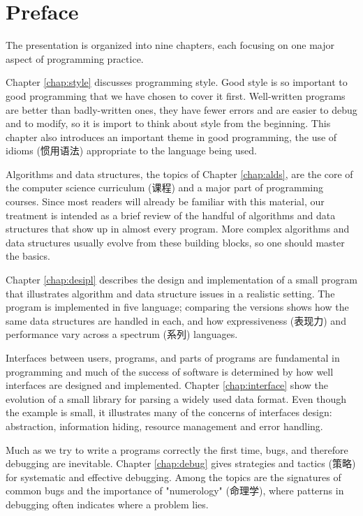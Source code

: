 
\chapter{Preface}
\label{chap:preface}
The presentation is organized into nine chapters, each focusing on one
major aspect of programming practice.

Chapter \ref{chap:style} discusses programming style. Good style is so
important to good programming that we have chosen to cover it first.
Well-written programs are better than badly-written ones, they have fewer
errors and are easier to debug and to modify, so it is import to think
about style from the beginning. This chapter also introduces an important
theme in good programming, the use of idioms (惯用语法) appropriate to the
language being used.

Algorithms and data structures, the topics of Chapter \ref{chap:alds}, are
the core of the computer science curriculum (课程) and a major part of
programming courses. Since most readers will already be familiar with this
material, our treatment is intended as a brief review of the handful of
algorithms and data structures that show up in almost every program. More
complex algorithms and data structures usually evolve from these building
blocks, so one should master the basics.

Chapter \ref{chap:desipl} describes the design and implementation of a
small program that illustrates algorithm and data structure issues in a
realistic setting. The program is implemented in five language; comparing
the versions shows how the same data structures are handled in each, and
how expressiveness (表现力) and performance vary across a spectrum (系列)
languages.

Interfaces between users, programs, and parts of programs are fundamental
in programming and much of the success of software is determined by how
well interfaces are designed and implemented. Chapter \ref{chap:interface}
show the evolution of a small library for parsing a widely used data
format. Even though the example is small, it illustrates many of the
concerns of interfaces design: abstraction, information hiding, resource
management and error handling.

Much as we try to write a programs correctly the first time, bugs, and
therefore debugging are inevitable. Chapter \ref{chap:debug} gives
strategies and tactics (策略) for systematic and effective debugging. Among
the topics are the signatures of common bugs and the importance of
"numerology" (命理学), where patterns in debugging often indicates where a
problem lies.

